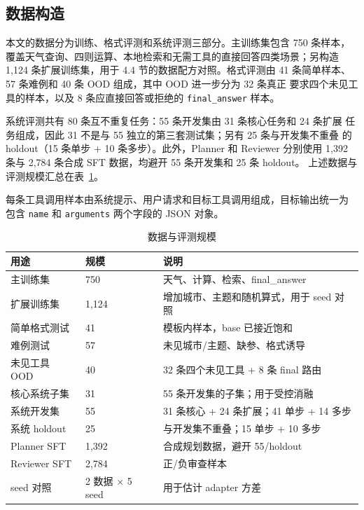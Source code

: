 \documentclass[UTF8,a4paper,12pt]{ctexart}
\begin{document}
\subsection{数据构造}
本文的数据分为训练、格式评测和系统评测三部分。主训练集包含 750 条样本，
覆盖天气查询、四则运算、本地检索和无需工具的直接回答四类场景；另构造
1,124 条扩展训练集，用于 4.4 节的数据配方对照。格式评测由
41 条简单样本、57 条难例和 40 条 OOD 组成，其中 OOD 进一步分为 32 条真正
要求四个未见工具的样本，以及 8 条应直接回答或拒绝的 \texttt{final\_answer}
样本。

系统评测共有 80 条互不重复任务：55 条开发集由 31 条核心任务和 24 条扩展
任务组成，因此 31 不是与 55 独立的第三套测试集；另有 25 条与开发集不重叠
的 holdout（15 条单步 + 10 条多步）。此外，Planner 和 Reviewer 分别使用
1,392 条与 2,784 条合成 SFT 数据，均避开 55 条开发集和 25 条 holdout。
上述数据与评测规模汇总在表~\ref{tab:data}。

每条工具调用样本由系统提示、用户请求和目标工具调用组成，目标输出统一为
包含 \texttt{name} 和 \texttt{arguments} 两个字段的 JSON 对象。

\begin{table}[H]
  \centering
  \small
  \caption{数据与评测规模}
  \label{tab:data}
  \begin{tabular}{lll}
    \toprule
    用途 & 规模 & 说明 \\
    \midrule
    主训练集 & 750 & 天气、计算、检索、final\_answer \\
    扩展训练集 & 1,124 & 增加城市、主题和随机算式，用于 seed 对照 \\
    简单格式测试 & 41 & 模板内样本，base 已接近饱和 \\
    难例测试 & 57 & 未见城市/主题、缺参、格式诱导 \\
    未见工具 OOD & 40 & 32 条四个未见工具 + 8 条 final 路由 \\
    核心系统子集 & 31 & 55 条开发集的子集；用于受控消融 \\
    系统开发集 & 55 & 31 条核心 + 24 条扩展；41 单步 + 14 多步 \\
    系统 holdout & 25 & 与开发集不重叠；15 单步 + 10 多步 \\
    Planner SFT & 1,392 & 合成规划数据，避开 55/holdout \\
    Reviewer SFT & 2,784 & 正/负审查样本 \\
    seed 对照 & 2 数据 $\times$ 5 seed & 用于估计 adapter 方差 \\
    \bottomrule
  \end{tabular}
\end{table}
\end{document}
